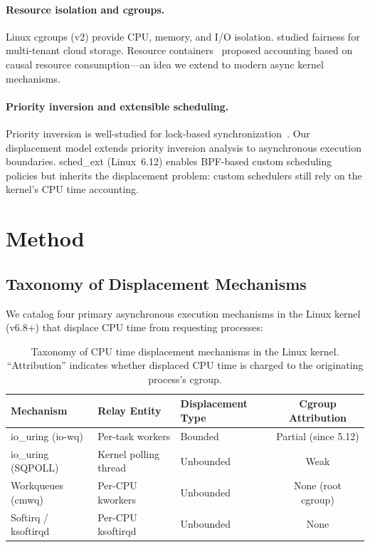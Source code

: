 \documentclass{article}
\begin{document}
\paragraph{Resource isolation and cgroups.}
Linux cgroups (v2) provide CPU, memory, and I/O isolation. \citet{shue2012performance} studied fairness for multi-tenant cloud storage. Resource containers~\citep{banga1999resource} proposed accounting based on causal resource consumption---an idea we extend to modern async kernel mechanisms.

\paragraph{Priority inversion and extensible scheduling.}
Priority inversion is well-studied for lock-based synchronization~\citep{sha1990priority}. Our displacement model extends priority inversion analysis to asynchronous execution boundaries. sched\_ext (Linux~6.12) enables BPF-based custom scheduling policies but inherits the displacement problem: custom schedulers still rely on the kernel's CPU time accounting.

\section{Method}
\label{sec:method}

\subsection{Taxonomy of Displacement Mechanisms}

We catalog four primary asynchronous execution mechanisms in the Linux kernel (v6.8+) that displace CPU time from requesting processes:

\begin{table}[t]
\caption{Taxonomy of CPU time displacement mechanisms in the Linux kernel. ``Attribution'' indicates whether displaced CPU time is charged to the originating process's cgroup.}
\label{tab:taxonomy}
\centering
\begin{tabular}{lllc}
\toprule
Mechanism & Relay Entity & Displacement Type & Cgroup Attribution \\
\midrule
io\_uring (io-wq) & Per-task workers & Bounded & Partial (since 5.12) \\
io\_uring (SQPOLL) & Kernel polling thread & Unbounded & Weak \\
Workqueues (cmwq) & Per-CPU kworkers & Unbounded & None (root cgroup) \\
Softirq / ksoftirqd & Per-CPU ksoftirqd & Unbounded & None \\
\bottomrule
\end{tabular}
\end{table}
\end{document}
